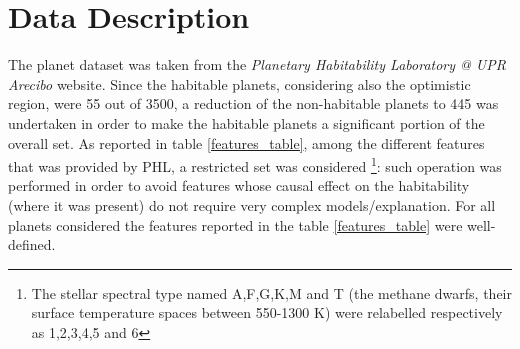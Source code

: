 \documentclass[
12pt, %
a4paper, %
oneside, %
headinclude,footinclude, %
BCOR5mm, %
]{scrartcl}
\begin{document}
\clearpage

\section{Data Description}

The planet dataset was taken from the \textit{Planetary Habitability Laboratory @ UPR Arecibo} \cite{planet_dataset} website. Since the habitable planets, considering also the optimistic region, were  55 out of 3500, a reduction of the non-habitable planets to 445 was undertaken in order to make the habitable planets a significant portion of the overall set. As reported in table \ref{features_table}, among the different features that was provided by PHL, a restricted set was considered \footnote{The stellar spectral type named A,F,G,K,M and T (the methane dwarfs, their surface temperature spaces between 550-1300 K) were relabelled respectively as 1,2,3,4,5 and 6}: such operation was performed in order to avoid features whose causal effect on the habitability (where it was present) do not require very complex models/explanation. For all planets considered the features reported in the table \ref{features_table} were well-defined. 
 
\end{document}
